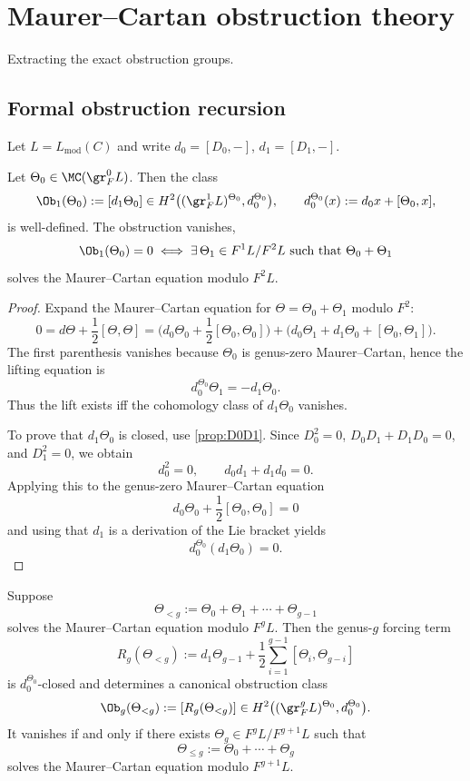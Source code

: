 \section{Maurer--Cartan obstruction theory}

Extracting the exact obstruction groups.

\subsection{Formal obstruction recursion}

Let $L=L_{\mathrm{mod}}(C)$ and write $d_0=[D_0,-]$, $d_1=[D_1,-]$.

\begin{theorem}\label{thm:Ob1}
Let $\Theta_0\in \MC(\gr_F^0L)$. Then the class
\[
\Ob_1(\Theta_0):=[d_1\Theta_0]
\in
H^2\big((\gr_F^1L)^{\Theta_0},d_0^{\Theta_0}\big),
\qquad
d_0^{\Theta_0}(x):=d_0x+[\Theta_0,x],
\]
is well-defined. The obstruction vanishes,
\[
\Ob_1(\Theta_0)=0
\iff
\exists\,\Theta_1\in F^1L/F^2L
\text{ such that }
\Theta_0+\Theta_1
\]
solves the Maurer--Cartan equation modulo $F^2L$.
\end{theorem}

\begin{proof}
Expand the Maurer--Cartan equation for $\Theta=\Theta_0+\Theta_1$ modulo $F^2$:
\[
0=d\Theta+\frac12[\Theta,\Theta]
=
\Big(d_0\Theta_0+\frac12[\Theta_0,\Theta_0]\Big)
+
\Big(d_0\Theta_1+d_1\Theta_0+[\Theta_0,\Theta_1]\Big).
\]
The first parenthesis vanishes because $\Theta_0$ is genus-zero Maurer--Cartan, hence the
lifting equation is
\[
d_0^{\Theta_0}\Theta_1=-d_1\Theta_0.
\]
Thus the lift exists iff the cohomology class of $d_1\Theta_0$ vanishes.

To prove that $d_1\Theta_0$ is closed, use \cref{prop:D0D1}. Since $D_0^2=0$,
$D_0D_1+D_1D_0=0$, and $D_1^2=0$, we obtain
\[
d_0^2=0,\qquad d_0d_1+d_1d_0=0.
\]
Applying this to the genus-zero Maurer--Cartan equation
\[
d_0\Theta_0+\frac12[\Theta_0,\Theta_0]=0
\]
and using that $d_1$ is a derivation of the Lie bracket yields
\[
d_0^{\Theta_0}(d_1\Theta_0)=0.
\]
\end{proof}

\begin{theorem}\label{thm:Obg}
Suppose
\[
\Theta_{<g}:=\Theta_0+\Theta_1+\cdots+\Theta_{g-1}
\]
solves the Maurer--Cartan equation modulo $F^gL$. Then the genus-$g$ forcing term
\[
R_g(\Theta_{<g})
:=
d_1\Theta_{g-1}
+\frac12\sum_{i=1}^{g-1}[\Theta_i,\Theta_{g-i}]
\]
is $d_0^{\Theta_0}$-closed and determines a canonical obstruction class
\[
\Ob_g(\Theta_{<g})
:=
[R_g(\Theta_{<g})]
\in
H^2\big((\gr_F^gL)^{\Theta_0},d_0^{\Theta_0}\big).
\]
It vanishes if and only if there exists $\Theta_g\in F^gL/F^{g+1}L$ such that
\[
\Theta_{\le g}:=\Theta_0+\cdots+\Theta_g
\]
solves the Maurer--Cartan equation modulo $F^{g+1}L$.
\end{theorem}

